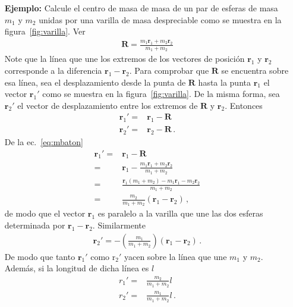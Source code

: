 \begin{itemize}
\item[\textbf{Ejemplo:}] Calcule el centro de masa de masa de un par de esferas de masa $m_1$ y $m_2$ unidas por una varilla de masa despreciable como se muestra en la figura~\ref{fig:varilla}. Ver
  \begin{align}
    \label{eq:mbaton}
    \mathbf{R}=\frac{m_1\mathbf{r}_1+m_2\mathbf{r}_2}{m_1+m_2}
  \end{align}
Note que la línea que une los extremos de los vectores de posición $\mathbf{r}_1$ y $\mathbf{r}_2$ corresponde a la diferencia $\mathbf{r}_1-\mathbf{r}_2$. Para comprobar que $\mathbf{R}$ se encuentra sobre esa línea,
sea el desplazamiento desde la punta de $\mathbf{R}$ hasta la punta $\mathbf{r}_1$ el vector $\mathbf{r}_1'$ como se muestra en la figura~\ref{fig:varilla}. De la misma forma, sea $\mathbf{r}_2'$ el vector de desplazamiento entre los extremos de $\mathbf{R}$ y $\mathbf{r}_2$. Entonces
\begin{align}
  \mathbf{r}_1'=&\mathbf{r}_1-\mathbf{R}\nonumber\\
  \mathbf{r}_2'=&\mathbf{r}_2-\mathbf{R}\,.
\end{align}
De la ec.~\eqref{eq:mbaton}
\begin{align}
  \mathbf{r}_1'=&\mathbf{r}_1-\mathbf{R}\nonumber\\
  =&\mathbf{r}_1-\frac{m_1\mathbf{r}_1+m_2\mathbf{r}_2}{m_1+m_2}\nonumber\\
    =&\frac{\mathbf{r}_1(m_1+m_2)-m_1\mathbf{r}_1-m_2\mathbf{r}_2}{m_1+m_2}\nonumber\\
    =&\frac{m_2}{m_1+m_2}(\mathbf{r}_1-\mathbf{r}_2)\,,
\end{align}
de modo que el vector $\mathbf{r}_1$ es paralelo a la varilla que une las dos esferas determinada por $\mathbf{r}_1-\mathbf{r}_2$. Similarmente
\begin{align}
 \mathbf{r}_2'=-\left(\frac{m_1}{m_1+m_2} \right)\left(\mathbf{r}_1-\mathbf{r}_2 \right)\,.
\end{align}
De modo que tanto $\mathbf{r}_1'$ como $\mathrm{r}_2'$ yacen sobre la línea que une $m_1$ y $m_2$. Además, si la longitud de dicha línea es $l$
\begin{align}
  r_1'=&\frac{m_2}{m_1+m_2}l\nonumber\\
  r_2'=&\frac{m_1}{m_1+m_2}l\,.
\end{align}


\end{itemize}

